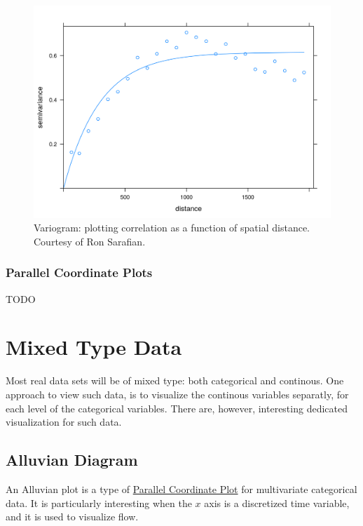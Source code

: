 \documentclass[]{book}
\theoremstyle{definition}
\theoremstyle{definition}
\theoremstyle{definition}
\theoremstyle{remark}
\begin{document}
\begin{figure}
\centering
\includegraphics{art/variogram.png}
\caption{Variogram: plotting correlation as a function of spatial
distance. Courtesy of Ron Sarafian.}
\end{figure}

\hypertarget{parcoord}{\subsubsection{Parallel Coordinate
Plots}\label{parcoord}}

TODO

\section{Mixed Type Data}\label{mixed-type-data}

Most real data sets will be of mixed type: both categorical and
continous. One approach to view such data, is to visualize the continous
variables separatly, for each level of the categorical variables. There
are, however, interesting dedicated visualization for such data.

\subsection{Alluvian Diagram}\label{alluvian}

An Alluvian plot is a type of \protect\hyperlink{parcoord}{Parallel
Coordinate Plot} for multivariate categorical data. It is particularly
interesting when the \(x\) axis is a discretized time variable, and it
is used to visualize flow.
\end{document}
